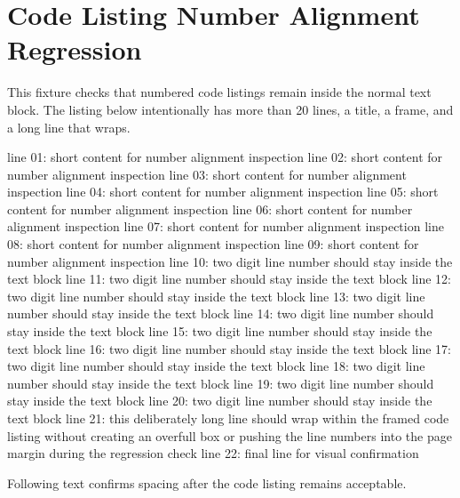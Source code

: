 \documentclass{../ndsudisq}
\begin{document}
\mainmattersetup
\chapter{Code Listing Number Alignment Regression}

This fixture checks that numbered code listings remain inside the normal text block.
The listing below intentionally has more than 20 lines, a title, a frame, and a long line that wraps.

\begin{ndsucodelisting}
line 01: short content for number alignment inspection
line 02: short content for number alignment inspection
line 03: short content for number alignment inspection
line 04: short content for number alignment inspection
line 05: short content for number alignment inspection
line 06: short content for number alignment inspection
line 07: short content for number alignment inspection
line 08: short content for number alignment inspection
line 09: short content for number alignment inspection
line 10: two digit line number should stay inside the text block
line 11: two digit line number should stay inside the text block
line 12: two digit line number should stay inside the text block
line 13: two digit line number should stay inside the text block
line 14: two digit line number should stay inside the text block
line 15: two digit line number should stay inside the text block
line 16: two digit line number should stay inside the text block
line 17: two digit line number should stay inside the text block
line 18: two digit line number should stay inside the text block
line 19: two digit line number should stay inside the text block
line 20: two digit line number should stay inside the text block
line 21: this deliberately long line should wrap within the framed code listing without creating an overfull box or pushing the line numbers into the page margin during the regression check
line 22: final line for visual confirmation
\end{ndsucodelisting}

Following text confirms spacing after the code listing remains acceptable.
\end{document}
